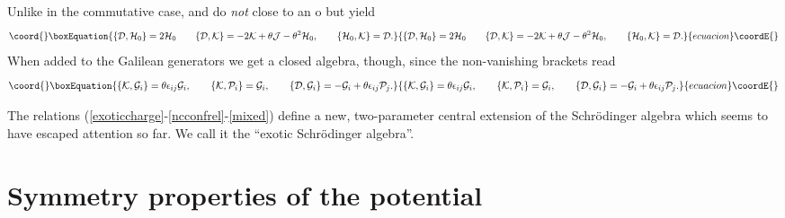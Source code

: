 \documentclass[a4paper,11pt]{article}
\let\ssection=\section
\renewcommand{\section}{\setcounter{equation}{0}\ssection}
\begin{document}
Unlike in the commutative case,
\coordHE{} and \coordHE{} do {\it not}
close to an o\coordHE{} \cite{JHN} but yield
\begin{equation}\coord{}\boxEquation{
	\{{\cal D},{\cal H}_{0}\}=2{\cal H}_{0}
	\qquad
	\{{\cal D},{\cal K}\}=-2{\cal K}+\theta{\cal J}-\theta^2{\cal H}_{0},
	\qquad
	\{{\cal H}_{0},{\cal K}\}={\cal D}.
\label{ncconfrel}
}{
	\{{\cal D},{\cal H}_{0}\}=2{\cal H}_{0}
	\qquad
	\{{\cal D},{\cal K}\}=-2{\cal K}+\theta{\cal J}-\theta^2{\cal H}_{0},
	\qquad
	\{{\cal H}_{0},{\cal K}\}={\cal D}.
}{ecuacion}\coordE{}\end{equation}
When added to the Galilean generators we get a closed
algebra, though, since the non-vanishing brackets read
\begin{equation}\coord{}\boxEquation{
     \{{\cal K},{\cal G}_{i}\}=\theta\epsilon_{ij}{\cal G}_{i},
     \qquad
     \{{\cal K},{\cal P}_{i}\}={\cal G}_{i},
     \qquad
     \{{\cal D},{\cal G}_{i}\}=-{\cal G}_{i}+\theta\epsilon_{ij}{\cal P}_{j}.
     \label{mixed}
}{
     \{{\cal K},{\cal G}_{i}\}=\theta\epsilon_{ij}{\cal G}_{i},
     \qquad
     \{{\cal K},{\cal P}_{i}\}={\cal G}_{i},
     \qquad
     \{{\cal D},{\cal G}_{i}\}=-{\cal G}_{i}+\theta\epsilon_{ij}{\cal P}_{j}.
     }{ecuacion}\coordE{}\end{equation}


The relations (\ref{exoticcharge}-\ref{ncconfrel}-\ref{mixed})
define a new, two-parameter central extension of the Schr\"odinger
algebra which seems to have escaped attention so far.
We call it the ``exotic Schr\"odinger algebra''.



\section{Symmetry properties of the potential}
\end{document}
